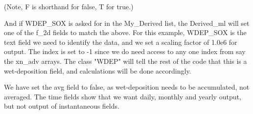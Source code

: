   (Note, F is shorthand for false, T for true.)\\
  \bigskip


 \noindent
  And if WDEP\_SOX is asked for in the My\_Derived list, the Derived\_ml will
  set one of the f\_2d fields to match the above.
  For this example, WDEP\_SOX is the text field we need to identify the
  data, and we set a scaling factor of 1.0e6 for output. The index
  is set to -1 since we do need access to any one index from say 
  the xn\_adv arrays.
   The class
  "WDEP" will tell the rest of the code that this is a wet-deposition field,
   and  calculations will be done accordingly. 

   We have set the avg field to false, as wet-deposition needs to be accumulated,
   not averaged. The time fields show that we want daily, monthly and yearly
   output, but not output of instantaneous fields.


